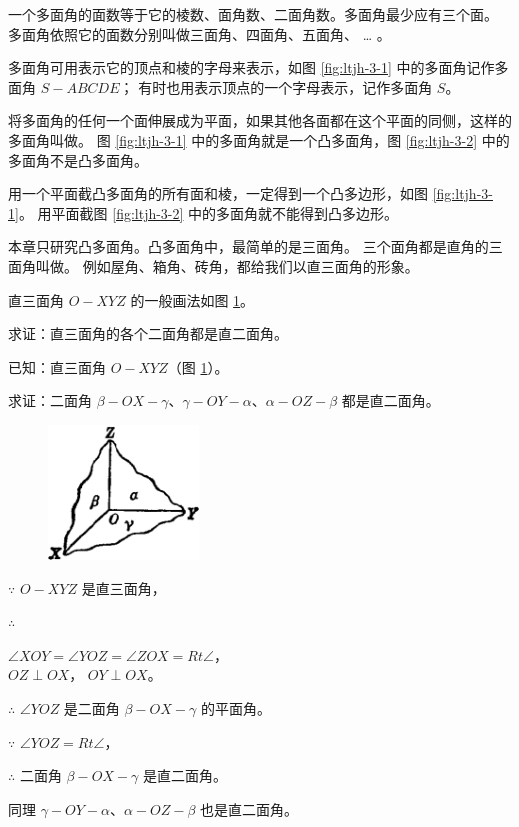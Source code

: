 一个多面角的面数等于它的棱数、面角数、二面角数。多面角最少应有三个面。
多面角依照它的面数分别叫做三面角、四面角、五面角、 … 。

多面角可用表示它的顶点和棱的字母来表示，如图 \ref{fig:ltjh-3-1} 中的多面角记作多面角 $S{-}ABCDE$；
有时也用表示顶点的一个字母表示，记作多面角 $S$。

将多面角的任何一个面伸展成为平面，如果其他各面都在这个平面的同侧，这样的多面角叫做。
图 \ref{fig:ltjh-3-1} 中的多面角就是一个凸多面角，图 \ref{fig:ltjh-3-2} 中的多面角不是凸多面角。

用一个平面截凸多面角的所有面和棱，一定得到一个凸多边形，如图 \ref{fig:ltjh-3-1}。
用平面截图 \ref{fig:ltjh-3-2} 中的多面角就不能得到凸多边形。

本章只研究凸多面角。凸多面角中，最简单的是三面角。
三个面角都是直角的三面角叫做。 例如屋角、箱角、砖角，都给我们以直三面角的形象。

直三面角 $O{-}XYZ$ 的一般画法如图 \ref{fig:ltjh-3-3}。


\liti[0] 求证：直三面角的各个二面角都是直二面角。

已知：直三面角 $O{-}XYZ$（图 \ref{fig:ltjh-3-3}）。

求证：二面角 $\beta{-}OX{-}\gamma$、$\gamma{-}OY{-}\alpha$、$\alpha{-}OZ{-}\beta$ 都是直二面角。

\begin{figure}
    \centering
    \includegraphics[width=4cm]{../pic/ltjh-ch3-03.png}
    \caption{}\label{fig:ltjh-3-3}
\end{figure}

\zhengming $\because$ \quad $O{-}XYZ$ 是直三面角，

$\therefore$ \quad \begin{zmtblr}[t]{}
    $\angle XOY = \angle YOZ = \angle ZOX = Rt \angle$， \\
    $OZ \perp OX$， $OY \perp OX$。
\end{zmtblr}

$\therefore$ \quad $\angle YOZ$ 是二面角 $\beta{-}OX{-}\gamma$ 的平面角。

$\because$ \quad $\angle YOZ = Rt \angle$，

$\therefore$ \quad 二面角 $\beta{-}OX{-}\gamma$ 是直二面角。

同理 \quad $\gamma{-}OY{-}\alpha$、$\alpha{-}OZ{-}\beta$ 也是直二面角。


\begin{lianxi}



\end{lianxi}

